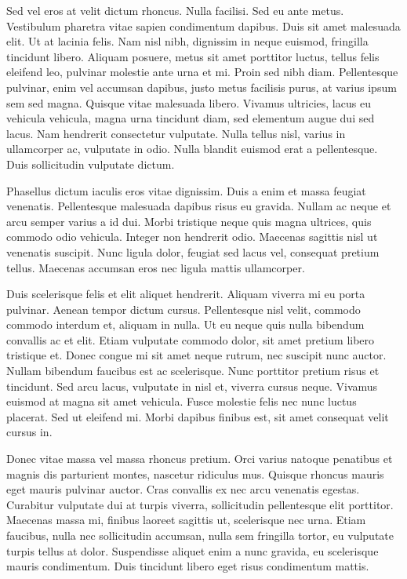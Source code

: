 \par
Sed vel eros at velit dictum rhoncus. Nulla facilisi. Sed eu ante metus. Vestibulum pharetra vitae sapien condimentum dapibus. Duis sit amet malesuada elit. Ut at lacinia felis. Nam nisl nibh, dignissim in neque euismod, fringilla tincidunt libero. Aliquam posuere, metus sit amet porttitor luctus, tellus felis eleifend leo, pulvinar molestie ante urna et mi. Proin sed nibh diam. Pellentesque pulvinar, enim vel accumsan dapibus, justo metus facilisis purus, at varius ipsum sem sed magna. Quisque vitae malesuada libero. Vivamus ultricies, lacus eu vehicula vehicula, magna urna tincidunt diam, sed elementum augue dui sed lacus. Nam hendrerit consectetur vulputate. Nulla tellus nisl, varius in ullamcorper ac, vulputate in odio. Nulla blandit euismod erat a pellentesque. Duis sollicitudin vulputate dictum.
\par
Phasellus dictum iaculis eros vitae dignissim. Duis a enim et massa feugiat venenatis. Pellentesque malesuada dapibus risus eu gravida. Nullam ac neque et arcu semper varius a id dui. Morbi tristique neque quis magna ultrices, quis commodo odio vehicula. Integer non hendrerit odio. Maecenas sagittis nisl ut venenatis suscipit. Nunc ligula dolor, feugiat sed lacus vel, consequat pretium tellus. Maecenas accumsan eros nec ligula mattis ullamcorper.
\par
Duis scelerisque felis et elit aliquet hendrerit. Aliquam viverra mi eu porta pulvinar. Aenean tempor dictum cursus. Pellentesque nisl velit, commodo commodo interdum et, aliquam in nulla. Ut eu neque quis nulla bibendum convallis ac et elit. Etiam vulputate commodo dolor, sit amet pretium libero tristique et. Donec congue mi sit amet neque rutrum, nec suscipit nunc auctor. Nullam bibendum faucibus est ac scelerisque. Nunc porttitor pretium risus et tincidunt. Sed arcu lacus, vulputate in nisl et, viverra cursus neque. Vivamus euismod at magna sit amet vehicula. Fusce molestie felis nec nunc luctus placerat. Sed ut eleifend mi. Morbi dapibus finibus est, sit amet consequat velit cursus in.
\par
Donec vitae massa vel massa rhoncus pretium. Orci varius natoque penatibus et magnis dis parturient montes, nascetur ridiculus mus. Quisque rhoncus mauris eget mauris pulvinar auctor. Cras convallis ex nec arcu venenatis egestas. Curabitur vulputate dui at turpis viverra, sollicitudin pellentesque elit porttitor. Maecenas massa mi, finibus laoreet sagittis ut, scelerisque nec urna. Etiam faucibus, nulla nec sollicitudin accumsan, nulla sem fringilla tortor, eu vulputate turpis tellus at dolor. Suspendisse aliquet enim a nunc gravida, eu scelerisque mauris condimentum. Duis tincidunt libero eget risus condimentum mattis.

